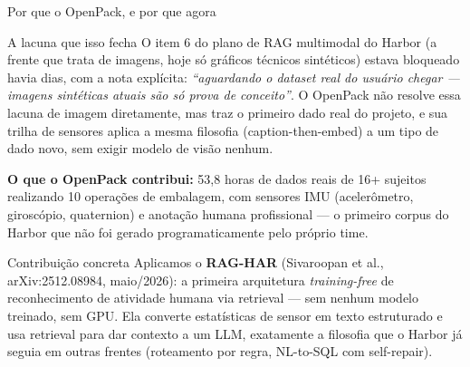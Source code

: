 \documentclass{beamer}
\newenvironment{numerobloco}[1]{\begin{block}{#1}}{\end{block}}
\newenvironment{decisaobloco}[1]{\begin{alertblock}{#1}}{\end{alertblock}}
\begin{document}
\begin{frame}{Por que o OpenPack, e por que agora}
  \begin{numerobloco}{A lacuna que isso fecha}
    O item 6 do plano de RAG multimodal do Harbor (a frente que trata de imagens, hoje só
    gráficos técnicos sintéticos) estava bloqueado havia dias, com a nota explícita:
    \emph{``aguardando o dataset real do usuário chegar — imagens sintéticas atuais são só
    prova de conceito''}. O OpenPack não resolve essa lacuna de imagem diretamente, mas traz
    o primeiro dado real do projeto, e sua trilha de sensores aplica a mesma filosofia
    (caption-then-embed) a um tipo de dado novo, sem exigir modelo de visão nenhum.
  \end{numerobloco}

  \pause
  \textbf{O que o OpenPack contribui:} 53,8 horas de dados reais de 16+ sujeitos realizando
  10 operações de embalagem, com sensores IMU (acelerômetro, giroscópio, quaternion) e
  anotação humana profissional — o primeiro corpus do Harbor que não foi gerado
  programaticamente pelo próprio time.

  \pause
  \begin{decisaobloco}{Contribuição concreta}
    Aplicamos o \textbf{RAG-HAR} (Sivaroopan et al., arXiv:2512.08984, maio/2026): a primeira
    arquitetura \emph{training-free} de reconhecimento de atividade humana via retrieval —
    sem nenhum modelo treinado, sem GPU. Ela converte estatísticas de sensor em texto
    estruturado e usa retrieval para dar contexto a um LLM, exatamente a filosofia que o
    Harbor já seguia em outras frentes (roteamento por regra, NL-to-SQL com self-repair).
  \end{decisaobloco}
\end{frame}
\end{document}
